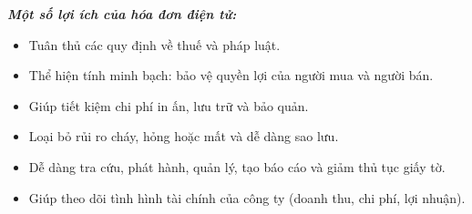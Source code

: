 \textbf{\textit{Một số lợi ích của hóa đơn điện tử:}}

\begin{itemize}

\item Tuân thủ các quy định về thuế và pháp luật.

\item Thể hiện tính minh bạch: bảo vệ quyền lợi của người mua và người bán.

\item Giúp tiết kiệm chi phí in ấn, lưu trữ và bảo quản.

\item Loại bỏ rủi ro cháy, hỏng hoặc mất và dễ dàng sao lưu.

\item Dễ dàng tra cứu, phát hành, quản lý, tạo báo cáo và giảm thủ tục giấy tờ.

\item Giúp theo dõi tình hình tài chính của công ty (doanh thu, chi phí, lợi nhuận).

\end{itemize}

